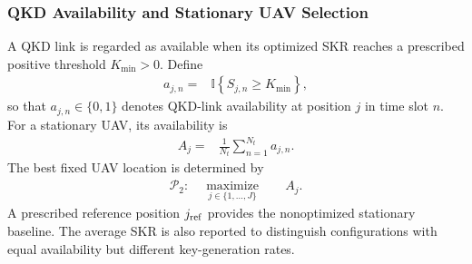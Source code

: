 \documentclass[conference,a4paper]{IEEEtran}
\begin{document}
\subsubsection{QKD Availability and Stationary UAV Selection}
A QKD link is regarded as available when its optimized
SKR reaches a prescribed positive threshold $K_{\min}>0$.
Define
\begin{align}
a_{j,n}
={}&\mathbb I\!\left\{S_{j,n}\geq K_{\min}\right\},
\label{eq:availability_indicator}
\end{align}
so that $a_{j,n}\in\{0,1\}$ denotes QKD-link
availability at position $j$ in time slot $n$.
For a stationary UAV, its availability is
\begin{align}
A_j
={}&\frac{1}{N_t}\sum_{n=1}^{N_t}a_{j,n}.
\label{eq:stationary_availability}
\end{align}
The best fixed UAV location is determined by
\begin{align}
\mathcal P_2:\quad
\underset{j\in\{1,\ldots,J\}}{\operatorname{maximize}}
\quad&A_j.
\label{eq:availability_stationary_opt}
\end{align}
A prescribed reference position $j_{\rm ref}$ provides the
nonoptimized stationary baseline. The average SKR is also
reported to distinguish configurations with equal
availability but different key-generation rates.
\end{document}
